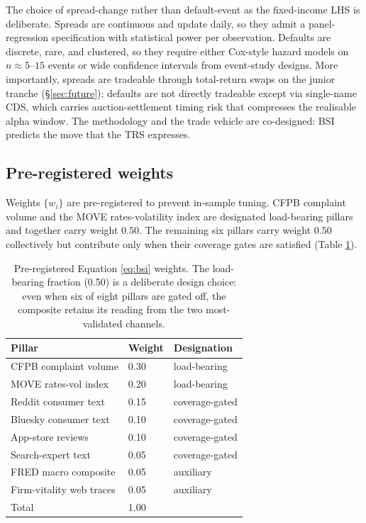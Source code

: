 \documentclass[11pt,a4paper]{article}
\begin{document}
The choice of spread-change rather than default-event as the fixed-income LHS is deliberate. Spreads are continuous and update daily, so they admit a panel-regression specification with statistical power per observation. Defaults are discrete, rare, and clustered, so they require either Cox-style hazard models on $n \approx 5$--$15$ events or wide confidence intervals from event-study designs. More importantly, spreads are tradeable through total-return swaps on the junior tranche (§\ref{sec:future}); defaults are not directly tradeable except via single-name CDS, which carries auction-settlement timing risk that compresses the realisable alpha window. The methodology and the trade vehicle are co-designed: BSI predicts the move that the TRS expresses.

\subsection{Pre-registered weights}

Weights $\{w_i\}$ are pre-registered to prevent in-sample tuning. CFPB complaint volume and the MOVE rates-volatility index are designated load-bearing pillars and together carry weight $0.50$. The remaining six pillars carry weight $0.50$ collectively but contribute only when their coverage gates are satisfied (Table \ref{tab:weights}).

\begin{table}[h]
\centering\small
\begin{tabular}{@{}p{4cm}p{2cm}p{8cm}@{}}
\toprule
\textbf{Pillar} & \textbf{Weight} & \textbf{Designation} \\
\midrule
CFPB complaint volume & 0.30 & load-bearing \\
MOVE rates-vol index & 0.20 & load-bearing \\
Reddit consumer text & 0.15 & coverage-gated \\
Bluesky consumer text & 0.10 & coverage-gated \\
App-store reviews & 0.10 & coverage-gated \\
Search-expert text & 0.05 & coverage-gated \\
FRED macro composite & 0.05 & auxiliary \\
Firm-vitality web traces & 0.05 & auxiliary \\
\midrule
Total & 1.00 & \\
\bottomrule
\end{tabular}
\caption{Pre-registered Equation \ref{eq:bsi} weights. The load-bearing fraction (0.50) is a deliberate design choice: even when six of eight pillars are gated off, the composite retains its reading from the two most-validated channels.}\label{tab:weights}
\end{table}
\end{document}
